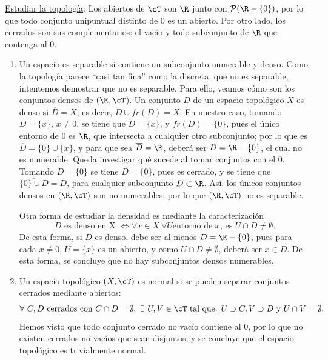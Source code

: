 \begin{solucion}
    \underline{Estudiar la topología}:
    Los abiertos de $\cT$ son $\R$ junto con $\mathcal{P}(\R - \{0\})$, por lo que todo conjunto unipuntual distinto de $0$ es un abierto. Por otro lado, los cerrados son sus complementarios: el vacío y todo subconjunto de $\R$ que contenga al 0.

    \begin{enumerate}[label=\alph*)]
        \item Un espacio es separable si contiene un subconjunto numerable y denso. Como la topología parece ``casi tan fina'' como la discreta, que no es separable, intentemos demostrar que no es separable. Para ello, veamos cómo son los conjuntos densos de \((\R,\cT\)). Un conjunto $D$ de un espacio topológico $X$ es denso si $\overline{D} = X$, es decir, $\mathring{D} \cup fr(D) = X$. En nuestro caso, tomando $D = \{x\}$, $x \neq 0$, se tiene que $\mathring{D} = \{x\}$, y $fr(D) = \{0\}$, pues el único entorno de $0$ es $\R$, que intersecta a cualquier otro subconjunto; por lo que es $\overline{D} = \{0\} \cup \{x\}$, y para que sea $\overline{D} = \R$, deberá ser $D = \R - \{0\}$, el cual no es numerable. Queda investigar qué sucede al tomar conjuntos con el $0$. Tomando $D = \{0\}$ se tiene $\overline{D} = \{0\}$, pues es cerrado, y se tiene que $\overline{\{0\} \cup D} = \overline{D}$, para cualquier subconjunto $D \subset \R$. Así, los únicos conjuntos densos en $(\R, \cT)$ son no numerables, por lo que $(\R, \cT)$ no es separable.
        
        Otra forma de estudiar la densidad es mediante la caracterización \[D \text{ es denso en X }\iff \forall x \in X \ \forall U \text{entorno de $x$, es } U \cap D \neq \emptyset.\] De esta forma, si $D$ es denso, debe ser al menos $D = \R -\{0\}$, pues para cada $x \neq 0$, $U = \{x\}$ es un abierto, y como $U \cap D \neq \emptyset$, deberá ser $x \in D$. De esta forma, se concluye que no hay subconjuntos densos numerables.

        \item Un espacio topológico $(X,\cT)$ es normal si se pueden separar conjuntos cerrados mediante abiertos:
        \[
            \forall\ C,D \text{ cerrados con } C \cap D = \emptyset, \ \exists \ U,V \in \cT \text{ tal que: } U \supset C, V \supset D \text{ y } U \cap V = \emptyset.
        \]
        Hemos visto que todo conjunto cerrado no vacío contiene al $0$, por lo que no existen cerrados no vacíos que sean disjuntos, y se concluye que el espacio topológico es trivialmente normal.


\end{enumerate}
\end{solucion}
